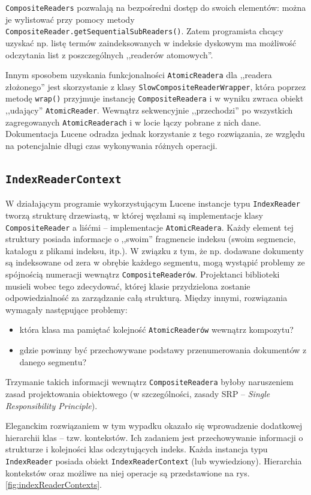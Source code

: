\texttt{CompositeReaders} pozwalają na bezpośredni dostęp do swoich elementów: można je wylistować przy pomocy metody \texttt{CompositeReader.getSequentialSubReaders()}. Zatem programista chcący uzyskać np. listę termów zaindeksowanych w indeksie dyskowym ma możliwość odczytania list z poszczególnych ,,readerów atomowych''.

Innym sposobem uzyskania funkcjonalności \texttt{AtomicReadera} dla ,,readera złożonego'' jest skorzystanie z klasy \texttt{SlowCompositeReaderWrapper}, która poprzez metodę \texttt{wrap()} przyjmuje instancję \texttt{CompositeReadera} i w wyniku zwraca obiekt ,,udający'' \texttt{AtomicReader}. Wewnątrz sekwencyjnie ,,przechodzi'' po wszystkich zagregowanych \texttt{AtomicReaderach} i w locie łączy pobrane z nich dane. Dokumentacja Lucene odradza jednak korzystanie z tego rozwiązania, ze względu na potencjalnie długi czas wykonywania różnych operacji.

\subsection{\texttt{IndexReaderContext}}

W działającym programie wykorzystującym Lucene instancje typu \texttt{IndexReader} tworzą strukturę drzewiastą, w której węzłami są implementacje klasy \texttt{CompositeReader} a liśćmi -- implementacje \texttt {AtomicReadera}. Każdy element tej struktury posiada informacje o ,,swoim'' fragmencie indeksu (swoim segmencie, katalogu z plikami indeksu, itp.). W związku z tym, że np. dodawane dokumenty są indeksowane od zera w obrębie każdego segmentu, mogą wystąpić problemy ze spójnością numeracji wewnątrz \texttt{CompositeReaderów}. Projektanci biblioteki musieli wobec tego zdecydować, której klasie przydzielona zostanie odpowiedzialność za zarządzanie całą strukturą. Między innymi, rozwiązania wymagały następujące problemy: 
\begin{itemize}  
 \item która klasa ma pamiętać kolejność \texttt{AtomicReaderów} wewnątrz kompozytu?
 \item gdzie powinny być przechowywane podstawy przenumerowania dokumentów z danego segmentu?
\end{itemize}
Trzymanie takich informacji wewnątrz \texttt{CompositeReadera} byłoby naruszeniem zasad projektowania obiektowego (w szczególności, zasady SRP -- \emph{Single Responsibility Principle}).

Eleganckim rozwiązaniem w tym wypadku okazało się wprowadzenie dodatkowej hierarchii klas -- tzw. kontekstów. Ich zadaniem jest przechowywanie informacji o strukturze i kolejności klas odczytujących indeks. Każda instancja typu \texttt{IndexReader} posiada obiekt \texttt{IndexReaderContext} (lub wywiedziony). Hierarchia kontekstów oraz możliwe na niej operacje są przedstawione na rys. \ref{fig:indexReaderContexts}. 


